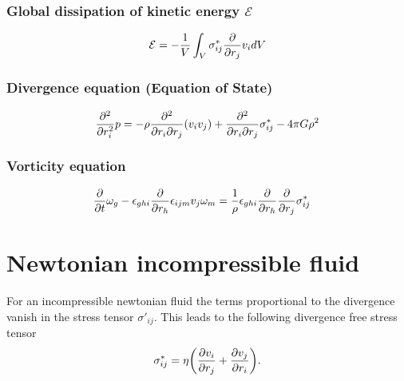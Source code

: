 \subsubsection*{Global dissipation of kinetic energy $\mathcal{E}$}
\begin{align}
\mathcal{E} = 
-\frac{1}{V} \int_V \sigma^*_{ij}\pd{r_j} v_i dV
\label{eq:icdiss}
\end{align}

\subsubsection*{Divergence equation (Equation of State)}
\begin{align}
\pdd{r_i}p= 
-\rho \frac{\partial^2}{\partial r_i \partial r_j}(v_i v_j)
+\frac{\partial^2}{\partial r_i \partial r_j}\sigma^*_{ij} 
-4\pi G \rho^2
\label{eq:icdiv}
\end{align}

\subsubsection*{Vorticity equation}
\begin{align}
\pd{t}\omega_g
&-\epsilon_{ghi}\pd{r_h} \epsilon_{ijm} v_j \omega_m =
\frac{1}{\rho}\epsilon_{ghi}\pd{r_h}\pd{r_j}\sigma^*_{ij}
\label{eq:icvort}
\end{align}


\section{Newtonian incompressible fluid}
For an incompressible newtonian fluid the terms proportional to the divergence
vanish in the stress tensor $\sigma'_{ij}$. This leads to the following
divergence free stress tensor
\begin{align}
\sigma^*_{ij}=\eta \lra{\ppd{r_j}{v_i}+\ppd{r_i}{v_j}}. 
\label{eq:nicstress}
\end{align}

